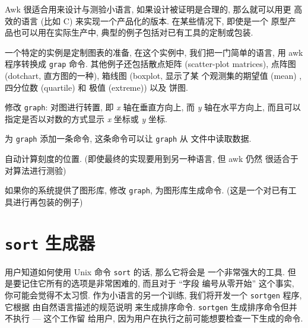 Awk 很适合用来设计与测验小语言, 如果设计被证明是合理的, 那么就可以用更
高效的语言 (比如 C) 来实现一个产品化的版本. 在某些情况下, 即使是一个
原型产品也可以用在实际生产中, 典型的例子包括对已有工具的定制或包装.

一个特定的实例是定制图表的准备, 在这个实例中, 我们把一门简单的语言, 用
awk 程序转换成 \texttt{grap} 命令. 其他例子还包括散点矩阵 (scatter-plot
matrices), 点阵图 (dotchart, 直方图的一种), 箱线图 (boxplot, 显示了某
个观测集的期望值 (mean) , 四分位数 (quartile) 和 极值 (extreme)) 以及
饼图.

\begin{exercise}
    \label{exer:zhuangzhi}
    修改 \texttt{graph}: 对图进行转置, 即 \textit{x} 轴在垂直方向上,
    而 \textit{y} 轴在水平方向上, 而且可以指定是否以对数的方式显示
    \textit{x} 坐标或 \textit{y} 坐标.
\end{exercise}

\begin{exercise}
    为 \texttt{graph} 添加一条命令, 这条命令可以让 \texttt{graph} 从
    文件中读取数据.
\end{exercise}

\begin{exercise}
    自动计算刻度的位置. (即使最终的实现要用到另一种语言, 但 awk 仍然
    很适合于对算法进行测验)
\end{exercise}

\begin{exercise}
    如果你的系统提供了图形库, 修改 \texttt{graph}, 为图形库生成命令.
    (这是一个对已有工具进行再包装的例子)
\end{exercise}

\section{\textbf{\texttt{sort}} 生成器}
\label{sec:a_sort_generator}

 用户知道如何使用 Unix 命令 \texttt{sort} 的话, 那么它将会是
一个非常强大的工具. 但是要记住它所有的选项是非常困难的, 而且对于 ``字段
编号从零开始'' 这个事实, 你可能会觉得不太习惯. 作为小语言的另一个训练,
我们将开发一个 \texttt{sortgen} 程序, 它根据 由自然语言描述的规范说明
来生成排序命令. \texttt{sortgen} 生成排序命令但并不执行 --- 这个工作留
给用户, 因为用户在执行之前可能想要检查一下生成的命令.

